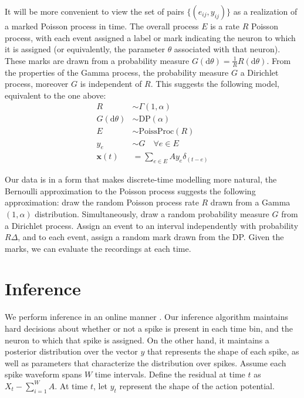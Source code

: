 \documentclass{article} %
\newcommand{\bx}{\mathbf{x}}
\newcommand{\dd}{\mathrm{d}}
\begin{document}
It will be more convenient to view the set of pairs $\{(e_{ij}, y_{ij})\}$ as a realization of a 
marked Poisson process in time. The overall process $E$ is a rate $R$ Poisson process, with each event assigned a label or mark indicating the neuron to which it
is assigned (or equivalently, the parameter $\theta$ associated with that neuron). These marks are drawn from a probability measure 
$G(\dd \theta) = \frac{1}{R} R(\dd \theta)$. From the properties of the Gamma process, the probability measure $G$ a Dirichlet process, moreover $G$ is
independent of $R$.
This suggests the following model, equivalent to the one above:
\begin{align}
  R & \sim \Gamma(1,\alpha) \\
  G(\dd \theta) & \sim \text{DP}(\alpha) \\
  E &\sim \text{PoissProc}(R) \\
  y_e &\sim G \quad \forall e \in E \\
  \bx(t) &= \sum_{e \in E} Ay_e \delta_{(t - e)} 
\end{align}


Our data is in a form that makes discrete-time modelling more natural,
the Bernoulli approximation to the Poisson process suggests the following approximation: draw the random Poisson
process rate $R$ drawn from a Gamma$(1,\alpha)$ distribution. Simultaneously, draw a random probability measure
 $G$ from a Dirichlet process. Assign an event to an interval independently with probability $R\Delta$, and to each event, assign a random mark drawn 
from the DP. Given the marks, we can evaluate the recordings at each time.

\section{Inference}
We perform inference in an online manner \cite{WangDun2009}. Our inference algorithm maintains hard decisions about whether or not a spike is
present in each time bin, and the neuron to which that spike is assigned. On the other hand, it maintains a posterior distribution over the vector
$y$ that represents the shape of each spike, as well as parameters that characterize the distribution over spikes.
Assume each spike waveform spans $W$ time intervals. Define the residual at time $t$ as $X_t - \sum_{i=1}^W A $.
At time $t$, let $y_t$ represent the shape of the action potential.
\end{document}

